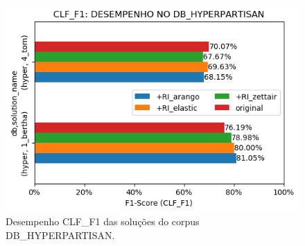 \begin{figure}[h]
    \centering
    \caption{Desempenho CLF\_F1 das soluções do corpus DB\_HYPERPARTISAN.}
    \vspace{-0.0cm}
    \begin{center}
        \includegraphics[width=1.0\textwidth]{img/clf-f1-bars-hyperpartisan.png}
    \end{center}
    \vspace{-0.0cm}
    \label{fig:clf-f1-bars-hyperpartisan}
\end{figure}